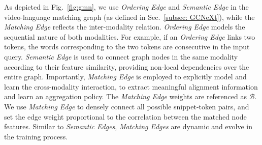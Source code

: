 \documentclass[10pt,twocolumn,letterpaper]{article}
\begin{document}
As depicted in Fig.~\ref{fig:gmn}, we use \textit{Ordering Edge} and \textit{Semantic Edge} in the video-language matching graph (as defined in Sec.~\ref{subsec: GCNeXt}), while the \textit{Matching Edge} reflects the inter-modality relation. 
\textit{Ordering Edge} models the sequential nature of both modalities. For example, if an \textit{Ordering Edge} links two tokens, the words corresponding to the two tokens are consecutive in the input query. 
\textit{Semantic Edge} is used to connect graph nodes in the same modality according to their feature similarity, providing non-local dependencies over the entire graph. 
Importantly, \textit{Matching Edge} is employed to explicitly model and learn the cross-modality interaction, to extract meaningful alignment information and learn an aggregation policy. 
The \textit{Matching Edge} weights are referenced as $\mathcal{B}$. We use \textit{Matching Edge} to densely connect all possible snippet-token pairs, and set the edge weight proportional to the correlation between the matched node features. 
Similar to \textit{Semantic Edges}, \textit{Matching Edges} are dynamic and evolve in the training process.
\end{document}
